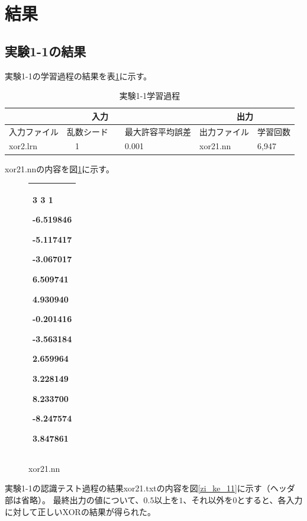 \documentclass[final]{jarticle}[2012/05/15]
\begin{document}
\section{結果}
\subsection{実験1-1の結果}
実験1-1の学習過程の結果を表\ref{zi_ga_11}に示す。\par
\begin{table}[h]
  \begin{center}
    \caption{実験1-1学習過程} \label{zi_ga_11}
    \begin{tabular}{|l|l|l|l|l|}\hline
      \multicolumn{3}{|c|}{入力} & \multicolumn{2}{|c|}{出力} \\ \hline
      入力ファイル & 乱数シード &　最大許容平均誤差 & 出力ファイル & 学習回数 \\ \hline
      xor2.lrn &　1 &　0.001 & xor21.nn & 6,947 \\ \hline
    \end{tabular}
  \end{center}
\end{table}
xor21.nnの内容を図\ref{zi_nn_11}に示す。\par
\begin{figure}[h]
  \begin{center}
    \begin{tabular}{|p{8cm}|}\hline
      3 3 1 \par
      -6.519846 \par
      -5.117417 \par
      -3.067017 \par
      6.509741 \par
      4.930940 \par
      -0.201416 \par
      -3.563184 \par
      2.659964 \par
      3.228149 \par
      8.233700 \par
      -8.247574 \par
      3.847861 \\ \hline
    \end{tabular}
    \caption{xor21.nn} \label{zi_nn_11}
  \end{center}
\end{figure}
実験1-1の認識テスト過程の結果xor21.txtの内容を図\ref{zi_ke_11}に示す（ヘッダ部は省略）。 最終出力の値について、$0.5$以上を$1$、それ以外を$0$とすると、各入力に対して正しいXORの結果が得られた。\par
\end{document}
